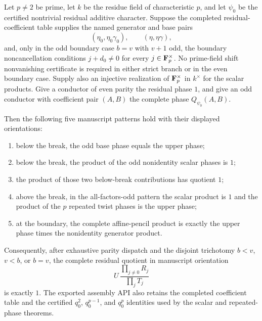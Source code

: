 \begin{theorem}\label{mod:cases-wildodd-parityreduction}
Let $p\ne2$ be prime, let $k$ be the residue field of characteristic $p$,
and let $\psi_0$ be the certified nontrivial residual additive character.
Suppose the completed residual-coefficient table supplies the named generator
and base pairs
\[
 (\eta_0,\eta_0\gamma_0),\qquad (\eta,\eta\gamma),
\]
and, only in the odd boundary case $b=v$ with $v+1$ odd, the boundary
noncancellation conditions $j+d_0\ne0$ for every $j\in\mathbf F_p^\times$.
No prime-field shift nonvanishing certificate is required in either strict
branch or in the even boundary case.  Supply also an injective realization of
$\mathbf F_p^\times$ in $k^\times$ for the scalar products.
Give a conductor of even parity the residual phase $1$, and give an odd
conductor with coefficient pair $(A,B)$ the complete phase
$Q_{\psi_0}(A,B)$.

Then the following five manuscript patterns hold with their displayed
orientations:
\begin{enumerate}
\item below the break, the odd base phase equals the upper phase;
\item below the break, the product of the odd nonidentity scalar phases is
  $1$;
\item the product of those two below-break contributions has quotient $1$;
\item above the break, in the all-factors-odd pattern the scalar product is
  $1$ and the product of the $p$ repeated twist phases is the upper phase;
\item at the boundary, the complete affine-pencil product is exactly the
  upper phase times the nonidentity generator product.
\end{enumerate}
Consequently, after exhaustive parity dispatch and the disjoint trichotomy
$b<v$, $v<b$, or $b=v$, the complete residual quotient in manuscript
orientation
\[
 U\,\frac{\prod_{j\ne0}R_j}{\prod_jT_j}
\]
is exactly $1$.  The exported assembly API also retains the completed
coefficient table and the certified $q_0^2$, $q_0^{p-1}$, and $q_0^p$
identities used by the scalar and repeated-phase theorems.
\leanok
{}
\FormalizationContract
\end{theorem}
